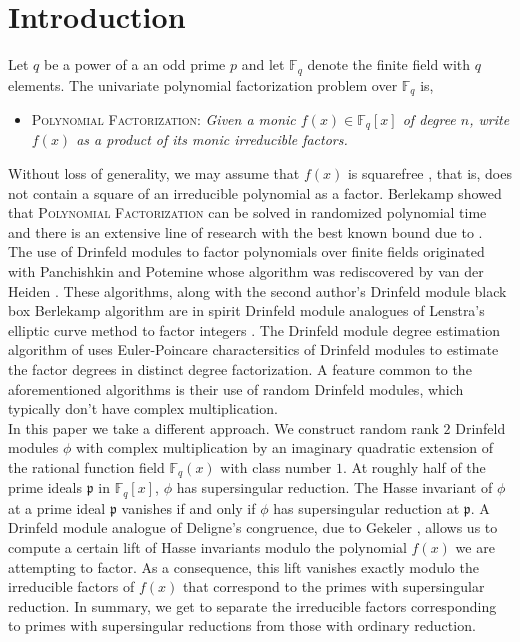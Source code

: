 \documentclass[12pt]{article}
\theoremstyle{plain}
\theoremstyle{definition}
\def\F{\ensuremath{\mathbb{F}}}
\newcommand{\p}{\mathfrak p}
\begin{document}
\section{Introduction}
Let $q$ be a power of a an odd prime $p$ and let $\F_q$ denote the finite field with $q$ elements. 
The univariate polynomial factorization problem over $\F_q$ is,
\begin{itemize}
 \item \textsc{Polynomial Factorization:} \textit{Given a monic $f(x) \in \mathbb{F}_q[x]$ of 
 degree $n$, write $f(x)$ as a product of its monic irreducible factors.}
\end{itemize}


Without loss of generality, we may assume that $f(x)$ is squarefree \cite{knu,yun}, that is, does 
not contain a square of an irreducible polynomial as a factor. Berlekamp showed that 
\textsc{Polynomial Factorization} can be solved in randomized polynomial time \cite{ber} and there 
is an extensive line of research \cite{cz,gs,ks,ku} with the best known bound due to \cite{ku}. \\

The use of Drinfeld modules to factor polynomials over finite fields originated with Panchishkin 
and Potemine \cite{pp} whose algorithm was rediscovered by van der Heiden \cite{vdH}. These 
algorithms, along with the second author's Drinfeld module black box Berlekamp algorithm \cite{nar} 
are in spirit Drinfeld module analogues of Lenstra's elliptic curve method to factor integers 
\cite{len}. The Drinfeld module degree estimation algorithm of \cite{nar} uses Euler-Poincare 
charactersitics of Drinfeld modules to estimate the factor degrees in distinct degree 
factorization. A feature common to the aforementioned algorithms is their use of random Drinfeld 
modules, which typically don't have complex multiplication. \\


In this paper we take a different approach. We construct random rank $2$ Drinfeld modules $\phi$ 
with complex multiplication by an imaginary quadratic extension of the rational function field 
$\F_q(x)$  with class number $1$. At roughly half of the prime ideals $\p$ in $\F_q[x]$, $\phi$ 
has supersingular reduction. The Hasse invariant of $\phi$ at a prime ideal $\p$ vanishes if and 
only if $\phi$ has supersingular reduction at $\p$. A Drinfeld module analogue of Deligne's 
congruence, due to Gekeler \cite{gek}, allows us to compute a certain lift of Hasse invariants 
modulo the polynomial $f(x)$ we are attempting to factor. As a consequence, this lift vanishes 
exactly modulo the irreducible factors of $f(x)$ that correspond to the primes with supersingular 
reduction. In summary, we get to separate the irreducible factors corresponding to primes with 
supersingular reductions from those with ordinary reduction.
\end{document}
